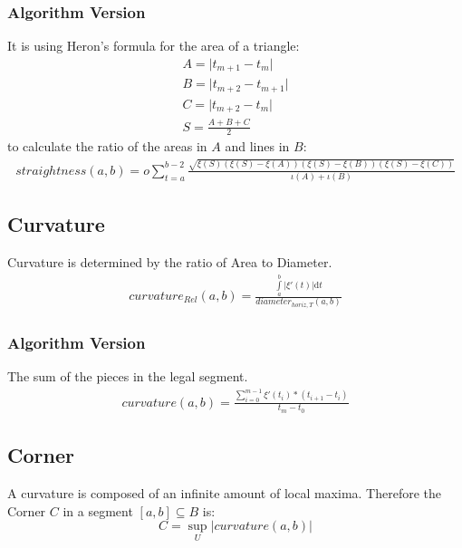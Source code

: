 \documentclass{report}
\newcommand\norm[1]{\left\lVert#1\right\rVert}
\begin{document}
\subsubsection{Algorithm Version}
It is using Heron's formula for the area of a triangle:
\begin{align*}
A=\lvert t_{m+1}-t_{m} \rvert\\
B=\lvert t_{m+2} - t_{m+1} \rvert\\
C=\lvert t_{m+2} - t_{m} \rvert\\
S=\frac{A+B+C}{2}
\end{align*}
to calculate the ratio of the areas in $A$ and lines in $B$:
\begin{align}
straightness(a,b)=o \sum_{t=a}^{b-2}\frac{\sqrt{\xi(S)(\xi(S)-\xi(A))(\xi(S)-\xi(B))(\xi(S)-\xi(C))}}{\iota(A)+\iota(B)}
\end{align}

\subsection{Curvature}
\iffalse
Because the diameter has to be calculated piece-wise, we have to set up a vector space with the turns $P_{n},P_{n+1} \in T$.
\begin{equation}
v \in (B,\norm{\cdot})
\end{equation}
Note: It is a Banach space.\\
\fi
Curvature is determined by the ratio of Area to Diameter.
\begin{align}
curvature_{Rel}(a,b) = \frac{\int \limits _{a}^{b} \lvert \xi'(t) \rvert \mathrm{d}t}{diameter_{horiz,T}(a,b)}
\end{align}
\subsubsection{Algorithm Version}
The sum of the pieces in the legal segment.
\begin{align}
curvature(a,b)= \frac{\sum \limits _{i=0}^{m-1}\xi'(t_{i})*(t_{i+1}-t_{i})}{t_{m}-t_{0}}
\end{align}

\subsection{Corner}
A curvature is composed of an infinite amount of local maxima. Therefore the Corner $C$ in a segment $[a,b] \subseteq B$ is:
\begin{equation}
C = \sup_{U}\lvert curvature(a,b) \rvert
\end{equation}
\end{document}
